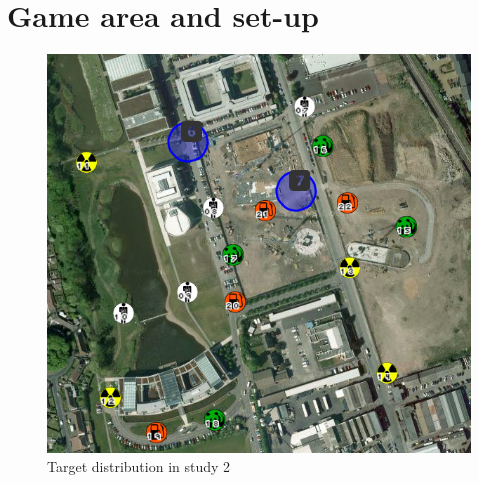 \section{Game area and set-up}
\begin{figure}[H]
  \centering
  \includegraphics[width=1\textwidth]{img/Appendix/targets1}
  \caption{Target distribution in study 2}
\end{figure}

